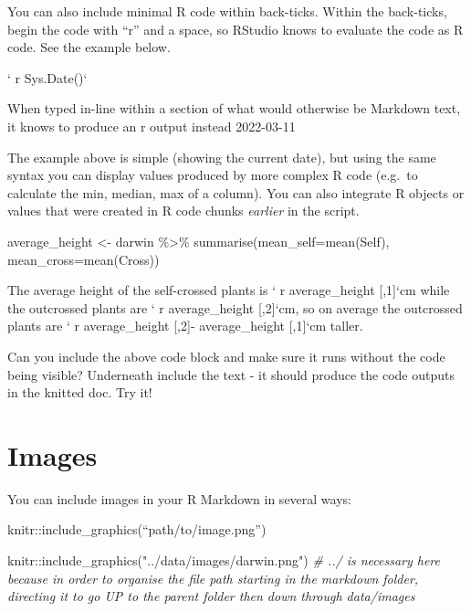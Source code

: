 \documentclass[
]{book}
\makeatletter
\newenvironment{Shaded}{\begin{snugshade}}{\end{snugshade}}
\newcommand{\AttributeTok}[1]{\textcolor[rgb]{0.77,0.63,0.00}{#1}}
\newcommand{\CommentTok}[1]{\textcolor[rgb]{0.56,0.35,0.01}{\textit{#1}}}
\newcommand{\FunctionTok}[1]{\textcolor[rgb]{0.00,0.00,0.00}{#1}}
\newcommand{\NormalTok}[1]{#1}
\newcommand{\OtherTok}[1]{\textcolor[rgb]{0.56,0.35,0.01}{#1}}
\newcommand{\SpecialCharTok}[1]{\textcolor[rgb]{0.00,0.00,0.00}{#1}}
\newcommand{\StringTok}[1]{\textcolor[rgb]{0.31,0.60,0.02}{#1}}
\newenvironment{kframe}{%
\medskip{}
\setlength{\fboxsep}{.8em}
 \def\at@end@of@kframe{}%
 \ifinner\ifhmode%
  \def\at@end@of@kframe{\end{minipage}}%
  \begin{minipage}{\columnwidth}%
 \fi\fi%
 \def\FrameCommand##1{\hskip\@totalleftmargin \hskip-\fboxsep
 \colorbox{shadecolor}{##1}\hskip-\fboxsep
     \hskip-\linewidth \hskip-\@totalleftmargin \hskip\columnwidth}%
 \MakeFramed {\advance\hsize-\width
   \@totalleftmargin\z@ \linewidth\hsize
   \@setminipage}}%
 {\par\unskip\endMakeFramed%
 \at@end@of@kframe}
\newenvironment{block}[1]
  {
  \begin{itemize}
  \renewcommand{\labelitemi}{
    \raisebox{-.7\height}[0pt][0pt]{
      {\setkeys{Gin}{width=3em,keepaspectratio}\texttt{[image: images/\#1]}}
    }
  }
  \setlength{\fboxsep}{1em}
  \begin{kframe}
  \item
  }
  {
  \end{kframe}
  \end{itemize}
  }
\newenvironment{rmdquestion}
  {\begin{block}{question}}
  {\end{block}}
\makeatother
\begin{document}
You can also include minimal R code within back-ticks. Within the back-ticks, begin the code with ``r'' and a space, so RStudio knows to evaluate the code as R code. See the example below.

` r Sys.Date()`

When typed in-line within a section of what would otherwise be Markdown text, it knows to produce an r output instead 2022-03-11

The example above is simple (showing the current date), but using the same syntax you can display values produced by more complex R code (e.g.~to calculate the min, median, max of a column). You can also integrate R objects or values that were created in R code chunks \emph{earlier} in the script.

\begin{Shaded}
\begin{Highlighting}[]
\NormalTok{average\_height }\OtherTok{\textless{}{-}}\NormalTok{ darwin }\SpecialCharTok{\%\textgreater{}\%} 
  \FunctionTok{summarise}\NormalTok{(}\AttributeTok{mean\_self=}\FunctionTok{mean}\NormalTok{(Self),}
            \AttributeTok{mean\_cross=}\FunctionTok{mean}\NormalTok{(Cross))}
\end{Highlighting}
\end{Shaded}

The average height of the self-crossed plants is ` r average\_height {[},1{]}`cm while the outcrossed plants are ` r average\_height {[},2{]}`cm, so on average the outcrossed plants are ` r average\_height {[},2{]}- average\_height {[},1{]}`cm taller.

\begin{rmdquestion}
Can you include the above code block and make sure it runs without the
code being visible? Underneath include the text - it should produce the
code outputs in the knitted doc. Try it!
\end{rmdquestion}

\hypertarget{images}{%
\section{Images}\label{images}}

You can include images in your R Markdown in several ways:

knitr::include\_graphics(``path/to/image.png'')

\begin{Shaded}
\begin{Highlighting}[]
\NormalTok{knitr}\SpecialCharTok{::}\FunctionTok{include\_graphics}\NormalTok{(}\StringTok{"../data/images/darwin.png"}\NormalTok{)}
\CommentTok{\# ../ is necessary here because in order to organise the file path starting in the markdown folder, directing it to go UP to the parent folder then down through data/images}
\end{Highlighting}
\end{Shaded}
\end{document}
